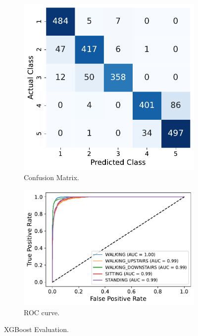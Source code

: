 \documentclass[10pt, a4paper, twocolumn]{article}
\begin{document}
\begin{figure}
    \centering
    \begin{subfigure}[t]{0.40\columnwidth}
    \includegraphics[width=\linewidth]{immagini simone/xgboost_conf_mtx.pdf}
    \caption{Confusion Matrix.}
    \label{fig:xconfusion}
\end{subfigure}
  \hfill %
\begin{subfigure}[t]{0.55\columnwidth}
    \includegraphics[width=\linewidth]{immagini simone/xgboost_roc.pdf}
    \caption{ROC curve.}
    \label{fig:xroc}
\end{subfigure}
\caption{XGBoost Evaluation.}
\label{fig:xgboost}
\end{figure}
\end{document}
